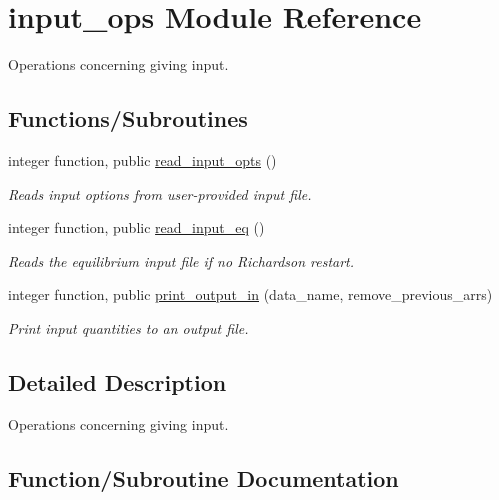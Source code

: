 \hypertarget{namespaceinput__ops}{}\section{input\+\_\+ops Module Reference}
\label{namespaceinput__ops}


Operations concerning giving input.  


\subsection*{Functions/\+Subroutines}
\begin{DoxyCompactItemize}
\item 
integer function, public \hyperlink{namespaceinput__ops_a434acca4f59f9dc1d91e04f846133684}{read\+\_\+input\+\_\+opts} ()
\begin{DoxyCompactList}\small\item\em Reads input options from user-\/provided input file. \end{DoxyCompactList}\item 
integer function, public \hyperlink{namespaceinput__ops_a577c897cc266961eb40bb5ef747fa077}{read\+\_\+input\+\_\+eq} ()
\begin{DoxyCompactList}\small\item\em Reads the equilibrium input file if no Richardson restart. \end{DoxyCompactList}\item 
integer function, public \hyperlink{namespaceinput__ops_a6a1237ee3005ebd6f4978e7092ab2dc5}{print\+\_\+output\+\_\+in} (data\+\_\+name, remove\+\_\+previous\+\_\+arrs)
\begin{DoxyCompactList}\small\item\em Print input quantities to an output file. \end{DoxyCompactList}\end{DoxyCompactItemize}


\subsection{Detailed Description}
Operations concerning giving input. 

\subsection{Function/\+Subroutine Documentation}
\mbox{\label{namespaceinput__ops_a6a1237ee3005ebd6f4978e7092ab2dc5}} 
